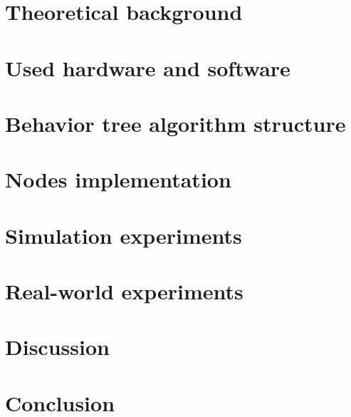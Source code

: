 \documentclass{ctuthesis}
\begin{document}
    \maketitle

    

    \chapter{Theoretical background}
    \label{chap:theory}
        
        
        
        

    \chapter{Used hardware and software}
    \label{chap:used}
        
        
                

    \chapter{Behavior tree algorithm structure}
    \label{chap:structure}
        

    \chapter{Nodes implementation}
    \label{chap:nodes}
        
        
        
        
    \chapter{Simulation experiments}
    \label{chap:simulation}
        

    \chapter{Real-world experiments}
    \label{chap:real}
        

    \chapter{Discussion}
    \label{chap:discussion}
        

    \chapter*{Conclusion}
        

    \appendix
        
        

        \printbibliography
\end{document}
